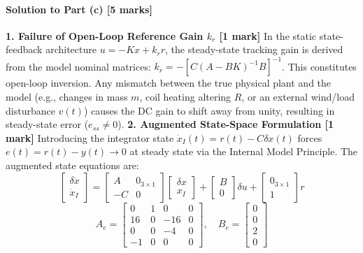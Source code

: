 \documentclass[12pt,onecolumn,twoside ]{article}
\begin{document}
	\paragraph{Solution to Part (c) [5 marks]}
	\textbf{1. Failure of Open-Loop Reference Gain $k_r$ [1 mark]} In the static state-feedback architecture $u = -K x + k_r r$, the steady-state tracking gain is derived from the model nominal matrices: $k_r = -[C(A - BK)^{-1}B]^{-1}$. This constitutes open-loop inversion. Any mismatch between the true physical plant and the model (e.g., changes in mass $m$, coil heating altering $R$, or an external wind/load disturbance $v(t)$) causes the DC gain to shift away from unity, resulting in steady-state error ($e_{ss} \neq 0$).
	\textbf{2. Augmented State-Space Formulation [1 mark]} Introducing the integrator state $\dot{x}_I(t) = r(t) - C \delta x(t)$ forces $e(t) = r(t) - y(t) \to 0$ at steady state via the Internal Model Principle. The augmented state equations are: \[
	\begin{bmatrix} \delta \dot{x} \\ \dot{x}_I \end{bmatrix} = \begin{bmatrix} A & 0_{3 \times 1} \\ -C & 0 \end{bmatrix} \begin{bmatrix} \delta x \\ x_I \end{bmatrix} + \begin{bmatrix} B \\ 0 \end{bmatrix} \delta u + \begin{bmatrix} 0_{3 \times 1} \\ 1 \end{bmatrix} r
	\] \[
	A_e = \begin{bmatrix} 0 & 1 & 0 & 0 \\ 16 & 0 & -16 & 0 \\ 0 & 0 & -4 & 0 \\ -1 & 0 & 0 & 0 \end{bmatrix}, \quad B_e = \begin{bmatrix} 0 \\ 0 \\ 2 \\ 0 \end{bmatrix}
	\]
\end{document}
